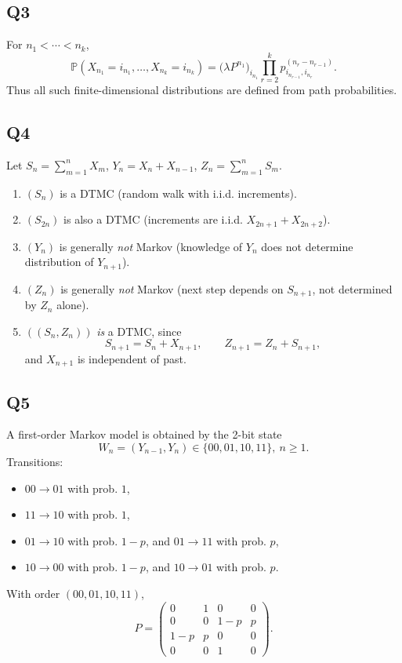 \documentclass[11pt]{article}
\newcommand{\PP}{\mathbb{P}}
\newcommand{\1}{\mathbf{1}}
\begin{document}
\subsection*{Q3}
For $n_1<\cdots<n_k$,
\[
\PP(X_{n_1}=i_{n_1},\dots,X_{n_k}=i_{n_k})
=\big(\lambda P^{n_1}\big)_{i_{n_1}}\prod_{r=2}^k p^{(n_r-n_{r-1})}_{i_{n_{r-1}},i_{n_r}}.
\]
Thus all such finite-dimensional distributions are defined from path probabilities.

\subsection*{Q4}
Let $S_n=\sum_{m=1}^nX_m$, $Y_n=X_n+X_{n-1}$, $Z_n=\sum_{m=1}^nS_m$.
\begin{enumerate}[label=(\alph*)]
\item $(S_n)$ is a DTMC (random walk with i.i.d. increments).
\item $(S_{2n})$ is also a DTMC (increments are i.i.d. $X_{2n+1}+X_{2n+2}$).
\item $(Y_n)$ is generally \emph{not} Markov (knowledge of $Y_n$ does not determine distribution of $Y_{n+1}$).
\item $(Z_n)$ is generally \emph{not} Markov (next step depends on $S_{n+1}$, not determined by $Z_n$ alone).
\item $((S_n,Z_n))$ \emph{is} a DTMC, since
\[
S_{n+1}=S_n+X_{n+1},\qquad Z_{n+1}=Z_n+S_{n+1},
\]
and $X_{n+1}$ is independent of past.
\end{enumerate}

\subsection*{Q5}
A first-order Markov model is obtained by the 2-bit state
\[
W_n=(Y_{n-1},Y_n)\in\{00,01,10,11\},\ n\ge1.
\]
Transitions:
\begin{itemize}
\item $00\to01$ with prob. $1$,
\item $11\to10$ with prob. $1$,
\item $01\to10$ with prob. $1-p$, and $01\to11$ with prob. $p$,
\item $10\to00$ with prob. $1-p$, and $10\to01$ with prob. $p$.
\end{itemize}
With order $(00,01,10,11)$,
\[
P=
\begin{pmatrix}
0&1&0&0\\
0&0&1-p&p\\
1-p&p&0&0\\
0&0&1&0
\end{pmatrix}.
\]
\end{document}

